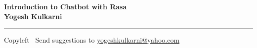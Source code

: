
\graphicspath{{images/}}

\footnotesize


\begin{center}
\Large{\textbf{Introduction to Chatbot with Rasa\\ Yogesh Kulkarni}}  
\end{center}

\begin{multicols}{2}

\end{multicols}

\rule{\linewidth}{0.25pt}
\scriptsize
Copyleft \textcopyleft\  Send suggestions to 
\href{http://www.yogeshkulkarni.com}{yogeshkulkarni@yahoo.com}


